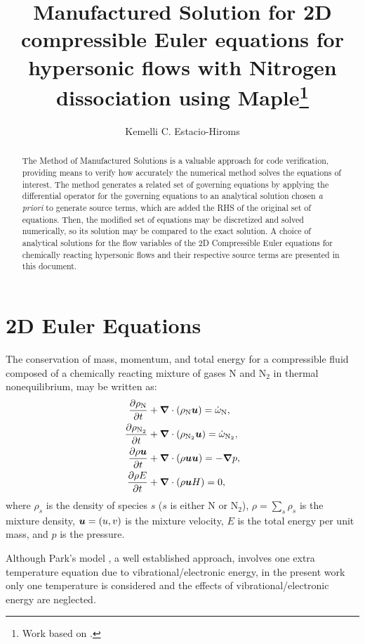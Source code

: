 \documentclass[10pt]{article}
\title{Manufactured Solution for 2D compressible Euler equations for hypersonic flows with Nitrogen dissociation using Maple\footnote{Work based on \citet*{Roy2002,Kirk2009}.}}
\author{Kemelli C. Estacio-Hiroms}
\newcommand{\diff}[2] {\dfrac{\partial #1 }{\partial #2}}
\newcommand{\gv}[1]{\ensuremath{\mbox{\boldmath$ #1 $}}}%
\newcommand{\grad}[1]{\gv{\nabla} #1}
\newcommand{\bv}[1]{\ensuremath{\mbox{\boldmath$ #1 $}}}
\begin{document}
\maketitle

\begin{abstract}
The Method of Manufactured Solutions is a valuable approach for code verification, providing means to verify how accurately the numerical method solves the equations of interest. The method generates a related set of governing equations by applying the differential operator for the governing equations to an analytical solution chosen \textit{a priori} to generate source terms, which are added the RHS of the original set of equations. Then, the modified set of equations may be discretized and solved numerically, so its solution may be compared to the exact solution. A choice of analytical solutions for the flow variables of the 2D Compressible Euler equations for chemically reacting hypersonic flows and their respective source terms are presented in this document.
\end{abstract}




\section{2D Euler Equations}
The conservation of mass, momentum, and total energy for a compressible fluid composed of a chemically reacting mixture of gases N and N$_2$ in thermal nonequilibrium, may be written as:
\begin{align}
 \label{eq:pde_comp_mass_N}
 \diff{\rho_{\text{N}}}{t} &+ \grad{}\cdot \left(\rho_{\text{N}}\bv{u}\right) = \dot{\omega}_{\text{N}}, \\
\label{eq:pde_comp_mass_N2}
 \diff{\rho_{\text{N}_2}}{t} &+ \grad{}\cdot \left(\rho_{\text{N}_2}\bv{u}\right) = \dot{\omega}_{\text{N}_2} ,\\
 \label{eq:pde_comp_mom}
 \diff{\rho\bv{u}}{t} &+ \grad{}\cdot\left(\rho\bv{u}\bv{u}\right) = -\grad{p} ,\\
 \label{eq:pde_comp_energy}
 \diff{\rho E}{t} &+ \grad{}\cdot\left(\rho \bv{u} H\right) = 0,
\end{align}
where $\rho_s$ is the density of species $s$ ($s$ is either N or N$_2$), $\rho=\sum_s \rho_s$ is the mixture density, $\bv{u}=(u,v)$ is the mixture velocity, $E$ is the total energy per unit mass, and $p$ is the pressure.

Although Park's model \citep{Park1990}, a well established approach, involves one extra temperature equation due to vibrational/electronic energy, in the present work only one temperature is considered and the effects of vibrational/electronic energy are neglected.
\end{document}
